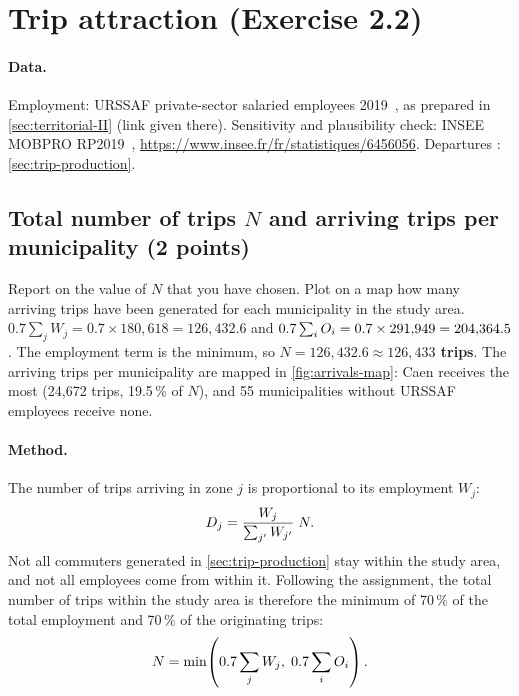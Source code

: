 \section{Trip attraction (Exercise 2.2)}\label{sec:trip-attraction}

\paragraph{Data.}
Employment: URSSAF private-sector salaried employees 2019~\cite{urssaf-employment}, as prepared in
\cref{sec:territorial-II} (link given there). Sensitivity and plausibility check: INSEE MOBPRO RP2019~\cite{insee-mobpro-2019},
\url{https://www.insee.fr/fr/statistiques/6456056}. Departures \Oi{}: \cref{sec:trip-production}.

\subsection{Total number of trips \texorpdfstring{$N$}{N} and arriving trips per municipality (2 points)}

\begin{qa}{Report on the value of $N$ that you have chosen. Plot on a map how many arriving trips have been generated
for each municipality in the study area.}
$0.7 \sum_j W_j = 0.7 \times 180{,}618 = 126{,}432.6$ and $0.7 \sum_i O_i = 0.7 \times 291{,}949 = 204{,}364.5$. The
employment term is the minimum, so \textbf{\boldmath $N = 126{,}432.6 \approx 126{,}433$ trips}. The arriving trips
per municipality are mapped in \cref{fig:arrivals-map}: Caen receives the most (24{,}672 trips, 19.5\,\% of $N$),
and 55 municipalities without URSSAF employees receive none.
\end{qa}

\paragraph{Method.}
The number of trips arriving in zone $j$ is proportional to its employment $W_j$:
\begin{equation}\label{eq:attraction}
  D_j = \frac{W_j}{\sum_{j'} W_{j'}}\; N .
\end{equation}
Not all commuters generated in \cref{sec:trip-production} stay within the study area, and not all employees come from
within it. Following the assignment, the total number of trips within the study area is therefore the minimum of
70\,\% of the total employment and 70\,\% of the originating trips:
\begin{equation}\label{eq:total-trips-N}
  N = \min\!\left(0.7 \sum_j W_j,\; 0.7 \sum_i O_i\right).
\end{equation}

